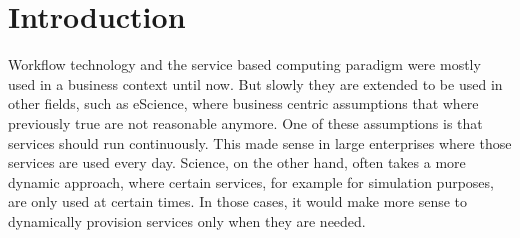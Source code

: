 \chapter{Introduction}

Workflow technology and the service based computing paradigm were mostly used in a business context until now.
But slowly they are extended to be used in other fields, such as eScience, where business centric assumptions that where previously true are not reasonable anymore.
One of these assumptions is that services should run continuously.
This made sense in large enterprises where those services are used every day.
Science, on the other hand, often takes a more dynamic approach, where certain services, for example for simulation purposes, are only used at certain times.
In those cases, it would make more sense to dynamically provision services only when they are needed.



